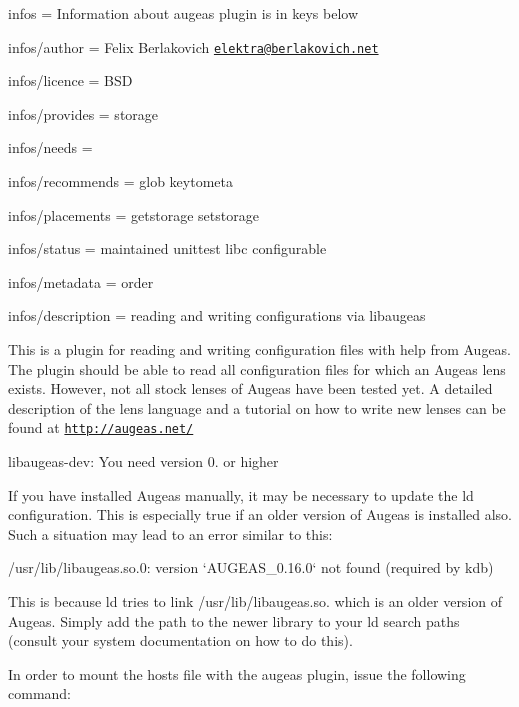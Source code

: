 
\begin{DoxyItemize}
\item infos = Information about augeas plugin is in keys below
\item infos/author = Felix Berlakovich \href{mailto:elektra@berlakovich.net}{\tt elektra@berlakovich.\+net}
\item infos/licence = B\+SD
\item infos/provides = storage
\item infos/needs =
\item infos/recommends = glob keytometa
\item infos/placements = getstorage setstorage
\item infos/status = maintained unittest libc configurable
\item infos/metadata = order
\item infos/description = reading and writing configurations via libaugeas
\end{DoxyItemize}

This is a plugin for reading and writing configuration files with help from Augeas. The plugin should be able to read all configuration files for which an Augeas lens exists. However, not all stock lenses of Augeas have been tested yet. A detailed description of the lens language and a tutorial on how to write new lenses can be found at \href{http://augeas.net/}{\tt http\+://augeas.\+net/}


\begin{DoxyItemize}
\item {\ttfamily libaugeas-\/dev}\+: You need version 0. or higher
\end{DoxyItemize}

If you have installed Augeas manually, it may be necessary to update the ld configuration. This is especially true if an older version of Augeas is installed also. Such a situation may lead to an error similar to this\+:


\begin{DoxyCode}
/usr/lib/libaugeas.so.0: version `AUGEAS\_0.16.0` not found (required by kdb)
\end{DoxyCode}


This is because {\ttfamily ld} tries to link {\ttfamily /usr/lib/libaugeas.so.} which is an older version of Augeas. Simply add the path to the newer library to your ld search paths (consult your system documentation on how to do this).

In order to mount the hosts file with the augeas plugin, issue the following command\+:


